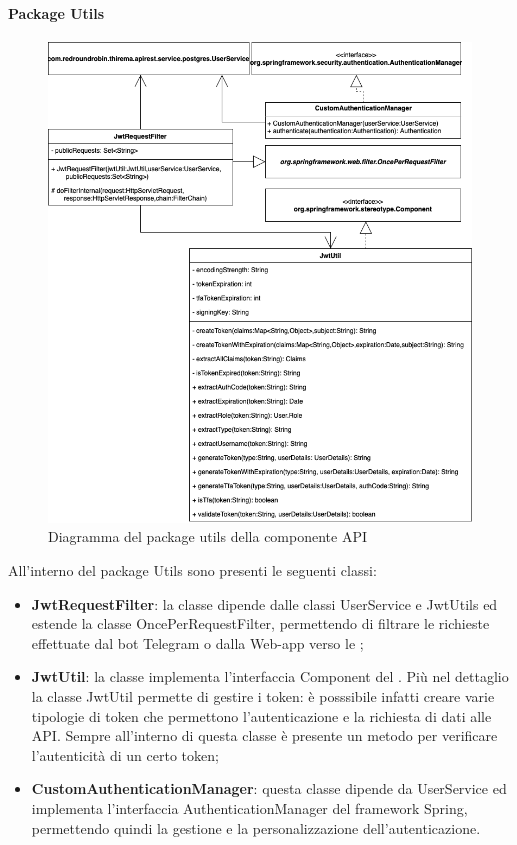 		\paragraph*{Package Utils}
		\begin{figure}[H]
			\centering
			\includegraphics[scale=0.550]{res/images/API/UtilsPackage.png}
			\caption{Diagramma del package utils della componente API}
			\label{Diagramma 11}
		\end{figure}
		\newpage
		All'interno del package Utils sono presenti le seguenti classi:
		\begin{itemize}
			\item \textbf{JwtRequestFilter}: la classe dipende dalle classi UserService e JwtUtils ed estende la classe OncePerRequestFilter, permettendo di filtrare le richieste effettuate dal bot Telegram o dalla Web-app verso le ;
			\item \textbf{JwtUtil}: la classe implementa l'interfaccia Component del . Più nel dettaglio la classe JwtUtil permette di gestire i token: è posssibile infatti creare varie tipologie di token che permettono l'autenticazione e la richiesta di dati alle API. Sempre all'interno di questa classe è presente un metodo per verificare l'autenticità di un certo token;
			\item \textbf{CustomAuthenticationManager}: questa classe dipende da UserService ed implementa l'interfaccia AuthenticationManager del framework Spring, permettendo quindi la gestione e la personalizzazione dell'autenticazione.
		\end{itemize}
		

